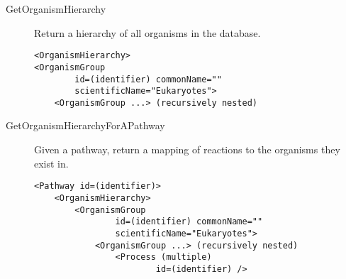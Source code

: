 \begin{description}
\begin{lstlisting}
    \end{lstlisting}

    \item[GetOrganismHierarchy] Return a hierarchy of all organisms in the
    database.

    \begin{lstlisting}
<OrganismHierarchy>
<OrganismGroup
        id=(identifier) commonName=""
        scientificName="Eukaryotes">
    <OrganismGroup ...> (recursively nested)
    \end{lstlisting}

    \item[GetOrganismHierarchyForAPathway] Given a pathway, return a mapping of
    reactions to the organisms they exist in.

    \begin{lstlisting}
<Pathway id=(identifier)>
    <OrganismHierarchy>
        <OrganismGroup
                id=(identifier) commonName=""
                scientificName="Eukaryotes">
            <OrganismGroup ...> (recursively nested)
                <Process (multiple)
                        id=(identifier) />
    \end{lstlisting}

\end{description}

